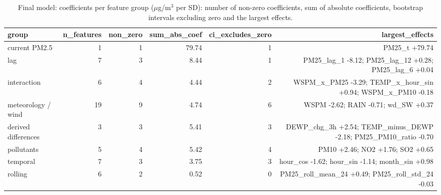 \begin{table}[t]
\centering
\small
\caption{Final model: coefficients per feature group ($\mu$g/m$^3$ per SD): number of non-zero coefficients, sum of absolute coefficients, bootstrap intervals excluding zero and the largest effects.}
\label{tab:table_S16_coefficients_by_group}
\begin{tabular}{lrrrrr}
\toprule
group & n\_features & non\_zero & sum\_abs\_coef & ci\_excludes\_zero & largest\_effects \\
\midrule
current PM2.5 & 1 & 1 & 79.74 & 1 & PM25\_t +79.74 \\
lag & 7 & 3 & 8.44 & 1 & PM25\_lag\_1 -8.12; PM25\_lag\_12 +0.28; PM25\_lag\_6 +0.04 \\
interaction & 6 & 4 & 4.44 & 2 & WSPM\_x\_PM25 -3.29; TEMP\_x\_hour\_sin +0.94; WSPM\_x\_PM10 -0.18 \\
meteorology / wind & 19 & 9 & 4.74 & 6 & WSPM -2.62; RAIN -0.71; wd\_SW +0.37 \\
derived differences & 3 & 3 & 5.41 & 3 & DEWP\_chg\_3h +2.54; TEMP\_minus\_DEWP -2.18; PM25\_PM10\_ratio -0.70 \\
pollutants & 5 & 4 & 5.42 & 4 & PM10 +2.46; NO2 +1.76; SO2 +0.65 \\
temporal & 7 & 3 & 3.75 & 3 & hour\_cos -1.62; hour\_sin -1.14; month\_sin +0.98 \\
rolling & 6 & 2 & 0.52 & 0 & PM25\_roll\_mean\_24 +0.49; PM25\_roll\_std\_24 -0.03 \\
\bottomrule
\end{tabular}
\end{table}
